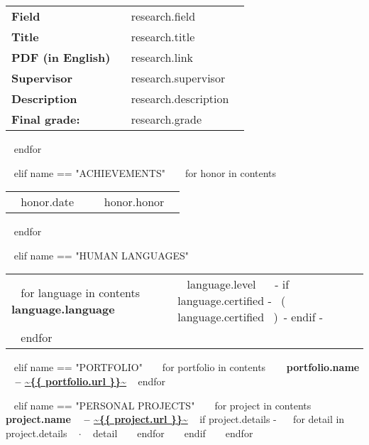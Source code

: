 \begin{minipage}{\textwidth}
\begin{tabular}{ @{} p{32mm} p{135mm} @{} }
    \small \bf Field & \small ~{{ research.field }}~ \\
    \small \bf Title & \small ~{{ research.title }}~ \\
    \small \bf PDF (in English) & \small ~{{ research.link }}~ \\
    \small \bf Supervisor & \small ~{{ research.supervisor }}~ \\
    \small \bf Description & \small ~{{ research.description }}~ \\
    \small \bf \small \color{maingrey} Final grade: & \small \color{maingrey} ~{{ research.grade }}~ \\
    
    \end{tabular}
    \vspace{1mm}
  ~{ endfor }~
  \vspace{4mm}

~{ elif name == "ACHIEVEMENTS" }~
  ~{ for honor in contents }~
    \begin{tabular}{ @{} p{32mm} p{135mm} @{} }
    {~{{ honor.date }}~} & {\small ~{{ honor.honor }}~}
    \end{tabular}
    \vspace{1mm}
  ~{ endfor }~

~{ elif name == "HUMAN LANGUAGES" }~
  \begin{tabular}{ @{} p{32mm} p{135mm} @{} }
  ~{ for language in contents }~
    \bf {~{{ language.language }}~} & {\small ~{{ language.level }}~ ~{- if language.certified -}~ \small\color{maingrey}\hspace{1mm}(~{{ language.certified }}~)~{- endif -}~} \\
  ~{ endfor }~
  \end{tabular}
  \vspace{2mm}

~{ elif name == "PORTFOLIO" }~
  ~{ for portfolio in contents }~
    {\bf ~{{ portfolio.name }}~ -- \color{maincolor}\url{~{{ portfolio.url }}~} }
    \vspace{1mm}
  ~{ endfor }~

~{ elif name == "PERSONAL PROJECTS" }~
  ~{ for project in contents }~
    {\small\bf ~{{ project.name }}~ -- \color{maincolor}\url{~{{ project.url }}~} }
    \vspace{1mm}
    ~{ if project.details -}~
    ~{ for detail in project.details }~
      $\cdot$ \small ~{{ detail }}~
    ~{ endfor }~
    ~{ endif }~
    \vspace{3mm}
  ~{ endfor }~
  \vspace{15mm}


\end{minipage}

